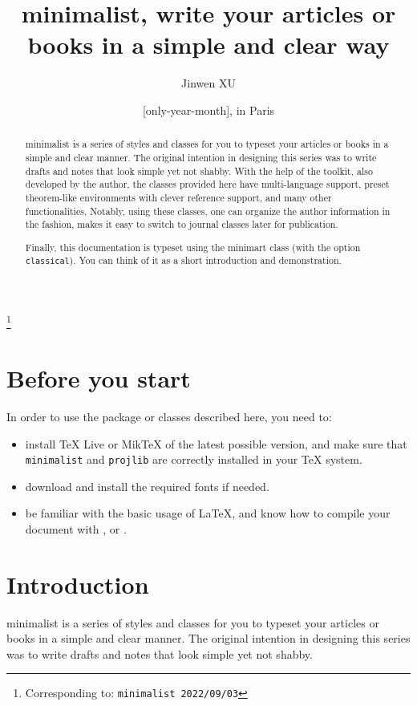 \documentclass[classical, simple name]{minimart}
\newcommand{\classoption}[1]{\texttt{\textcolor{code-option}{#1}}}
\providecommand{\minimalist}{\textsf{minimalist}}
\providecommand{\minimart}{\textsf{minimart}}
\let\LevelOneTitle\section
\begin{document}
\def\PackageVersion{2022/09/03}

\title{\minimalist{}, write your articles or books in a simple and clear way}
\author{Jinwen XU}
\thanks{Corresponding to: \texttt{\minimalist{} \PackageVersion}}
\date{\TheDate{\PackageVersion}[only-year-month], in Paris}

\maketitle

\begin{abstract}
    \minimalist{} is a series of styles and classes for you to typeset your articles or books in a simple and clear manner. The original intention in designing this series was to write drafts and notes that look simple yet not shabby. With the help of the \ProjLib{} toolkit, also developed by the author, the classes provided here have multi-language support, preset theorem-like environments with clever reference support, and many other functionalities. Notably, using these classes, one can organize the author information in the \AmS{} fashion, makes it easy to switch to journal classes later for publication.

    Finally, this documentation is typeset using the \minimart{} class (with the option \classoption{classical}). You can think of it as a short introduction and demonstration.
\end{abstract}


\setcounter{tocdepth}{2}
\tableofcontents


\medskip
\LevelOneTitle*{Before you start}
In order to use the package or classes described here, you need to:
\begin{itemize}
    \item install TeX Live or MikTeX of the latest possible version, and make sure that \texttt{minimalist} and \texttt{projlib} are correctly installed in your \TeX{} system.
    \item download and install the required fonts if needed.
    \item be familiar with the basic usage of \LaTeX{}, and know how to compile your document with ,  or .
\end{itemize}

\LevelOneTitle{Introduction}

\minimalist{} is a series of styles and classes for you to typeset your articles or books in a simple and clear manner. The original intention in designing this series was to write drafts and notes that look simple yet not shabby.
\end{document}
